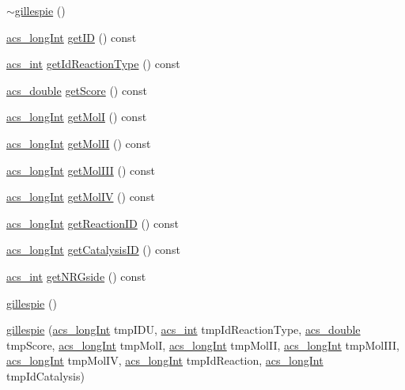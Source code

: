 \begin{DoxyCompactItemize}
\item 
\hyperlink{a00014_a33a97651932d8f82d82d164c94a2eae7}{$\sim$gillespie} ()
\item 
\hyperlink{a00050_a19319d75f02db4308bc5c0026d98cd85}{acs\+\_\+long\+Int} \hyperlink{a00014_a6aba3b283efc955bd4869f663ab877d6}{get\+I\+D} () const 
\item 
\hyperlink{a00050_a8d277355641a098190360234e2ebde35}{acs\+\_\+int} \hyperlink{a00014_a25d1e86363cdd7fabbb624b85620d1db}{get\+Id\+Reaction\+Type} () const 
\item 
\hyperlink{a00050_ab776853a005fcbf56af0424a2a4dd607}{acs\+\_\+double} \hyperlink{a00014_aa0ba52c30f6172a034e3b29afd074106}{get\+Score} () const 
\item 
\hyperlink{a00050_a19319d75f02db4308bc5c0026d98cd85}{acs\+\_\+long\+Int} \hyperlink{a00014_a8de52ad4b41daa64e69c897541b69629}{get\+Mol\+I} () const 
\item 
\hyperlink{a00050_a19319d75f02db4308bc5c0026d98cd85}{acs\+\_\+long\+Int} \hyperlink{a00014_a842457bf58d6af34b992a2c3fe27e4f6}{get\+Mol\+I\+I} () const 
\item 
\hyperlink{a00050_a19319d75f02db4308bc5c0026d98cd85}{acs\+\_\+long\+Int} \hyperlink{a00014_ab3d608ab2016a5a06408a76a1d12aabf}{get\+Mol\+I\+I\+I} () const 
\item 
\hyperlink{a00050_a19319d75f02db4308bc5c0026d98cd85}{acs\+\_\+long\+Int} \hyperlink{a00014_a01e1fb80634ae8fd32ce20fd7b5181ba}{get\+Mol\+I\+V} () const 
\item 
\hyperlink{a00050_a19319d75f02db4308bc5c0026d98cd85}{acs\+\_\+long\+Int} \hyperlink{a00014_a8d4daffecd91b32fb59a94eae6de8d0e}{get\+Reaction\+I\+D} () const 
\item 
\hyperlink{a00050_a19319d75f02db4308bc5c0026d98cd85}{acs\+\_\+long\+Int} \hyperlink{a00014_a0f2202c3d3662ce7cec6b127f066f715}{get\+Catalysis\+I\+D} () const 
\item 
\hyperlink{a00050_a8d277355641a098190360234e2ebde35}{acs\+\_\+int} \hyperlink{a00014_ad668afc14941b6842c703046a1a2d4c1}{get\+N\+R\+Gside} () const 
\item 
\hyperlink{a00014_a1487279f0440557a26662ff6356b8c17}{gillespie} ()
\item 
\hyperlink{a00014_af763c24d6107109108d32b5cc21c116a}{gillespie} (\hyperlink{a00050_a19319d75f02db4308bc5c0026d98cd85}{acs\+\_\+long\+Int} tmp\+I\+D\+U, \hyperlink{a00050_a8d277355641a098190360234e2ebde35}{acs\+\_\+int} tmp\+Id\+Reaction\+Type, \hyperlink{a00050_ab776853a005fcbf56af0424a2a4dd607}{acs\+\_\+double} tmp\+Score, \hyperlink{a00050_a19319d75f02db4308bc5c0026d98cd85}{acs\+\_\+long\+Int} tmp\+Mol\+I, \hyperlink{a00050_a19319d75f02db4308bc5c0026d98cd85}{acs\+\_\+long\+Int} tmp\+Mol\+I\+I, \hyperlink{a00050_a19319d75f02db4308bc5c0026d98cd85}{acs\+\_\+long\+Int} tmp\+Mol\+I\+I\+I, \hyperlink{a00050_a19319d75f02db4308bc5c0026d98cd85}{acs\+\_\+long\+Int} tmp\+Mol\+I\+V, \hyperlink{a00050_a19319d75f02db4308bc5c0026d98cd85}{acs\+\_\+long\+Int} tmp\+Id\+Reaction, \hyperlink{a00050_a19319d75f02db4308bc5c0026d98cd85}{acs\+\_\+long\+Int} tmp\+Id\+Catalysis)

\end{DoxyCompactItemize}
